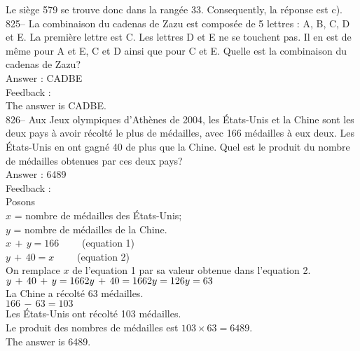 ﻿\documentclass[letterpaper, 12pt]{article}
\begin{document}
Le si\`ege 579 se trouve donc dans la rang\'ee 33.  Consequently, la
r\'eponse est c).\\

825-- La combinaison du cadenas de Zazu est compos\'ee de 5 lettres : A, B,
C, D et E.  La premi\`ere lettre est C.  Les lettres D et E ne se touchent
pas.  Il en est de m\^eme pour A et E, C et D ainsi que pour C et E.  Quelle
est la combinaison du cadenas de Zazu?\\

Answer : CADBE\\

Feedback : \\
The answer is CADBE.\\

826-- Aux Jeux olympiques d'Ath\`enes de 2004, les \'Etats-Unis et la Chine
sont les deux pays \`a avoir r\'ecolt\'e le plus de m\'edailles,  avec 166
m\'edailles \`a eux deux.  Les \'Etats-Unis en ont gagn\'e 40 de plus que la
Chine.  Quel est le produit du nombre de m\'edailles obtenues par ces deux
pays?\\

Answer : 6489\\

Feedback : \\
Posons\\
$x$ = nombre de m\'edailles des \'Etats-Unis;\\
$y$ = nombre de m\'edailles de la Chine.\\

$x\,+\,y=166 \qquad$ (equation 1)\\
$y\,+\,40=x \qquad$ (equation 2)\\

On remplace $x$ de l'equation 1 par sa valeur obtenue dans l'equation
2.\\
$y\,+\,40\,+\,y=166\\
2y\,+\,40=166\\
2y=126\\
y=63$\\
La Chine a r\'ecolt\'e 63 m\'edailles.\\

$166\,-\,63=103$\\
Les \'Etats-Unis ont r\'ecolt\'e 103 m\'edailles.  \\

Le produit des nombres de m\'edailles est $103\times63=6489$.\\
The answer is 6489.\\
\end{document}

